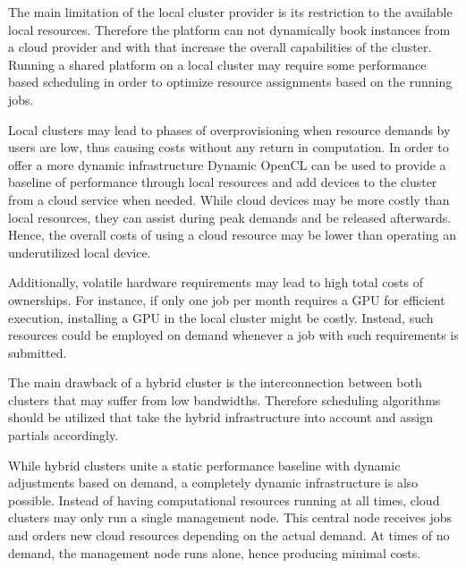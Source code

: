 \begin{description}[style=nextline]
	The main limitation of the local cluster provider is its restriction to the available local resources. Therefore the platform can not dynamically book instances from a cloud provider and with that increase the overall capabilities of the cluster. Running a shared platform on a local cluster may require some performance based scheduling in order to optimize resource assignments based on the running jobs.

	\item[Hybrid Cloud Provider]
	Local clusters may lead to phases of overprovisioning when resource demands by users are low, thus causing costs without any return in computation. In order to offer a more dynamic infrastructure Dynamic OpenCL can be used to provide a baseline of performance through local resources and add devices to the cluster from a cloud service when needed. While cloud devices may be more costly than local resources, they can assist during peak demands and be released afterwards. Hence, the overall costs of using a cloud resource may be lower than operating an underutilized local device.

	Additionally, volatile hardware requirements may lead to high total costs of ownerships. For instance, if only one job per month requires a GPU for efficient execution, installing a GPU in the local cluster might be costly. Instead, such resources could be employed on demand whenever a job with such requirements is submitted.

	The main drawback of a hybrid cluster is the interconnection between both clusters that may suffer from low bandwidths. Therefore scheduling algorithms should be utilized that take the hybrid infrastructure into account and assign partials accordingly.

	\item[Cloud Cluster Provider]
	While hybrid clusters unite a static performance baseline with dynamic adjustments based on demand, a completely dynamic infrastructure is also possible. Instead of having computational resources running at all times, cloud clusters may only run a single management node. This central node receives jobs and orders new cloud resources depending on the actual demand. At times of no demand, the management node runs alone, hence producing minimal costs.


\end{description}
